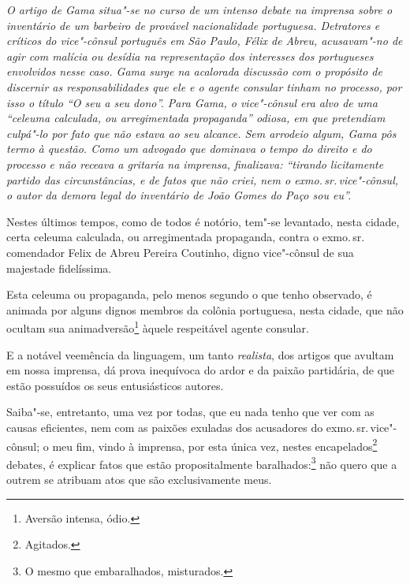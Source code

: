 
\begin{flushleft}
{\footnotesize\itshape
O artigo de Gama situa"-se no
curso de um intenso debate na imprensa sobre o inventário de um barbeiro
de provável nacionalidade portuguesa. Detratores e críticos do
vice"-cônsul português em São Paulo, Félix de Abreu, acusavam"-no de agir
com malícia ou desídia na representação dos interesses dos portugueses
envolvidos nesse caso. Gama surge na acalorada discussão com o propósito
de discernir as responsabilidades que ele e o agente consular tinham no
processo, por isso o título ``O seu a seu dono''. Para Gama, o vice"-cônsul
era alvo de uma ``celeuma calculada, ou arregimentada propaganda'' odiosa,
em que pretendiam culpá"-lo por fato que não estava ao seu alcance. Sem
arrodeio algum, Gama pôs termo à questão. Como um advogado que dominava
o tempo do direito e do processo e não receava a gritaria na imprensa,
finalizava: ``tirando licitamente partido das circunstâncias, e de
fatos que não criei, nem o exmo.\,sr.\,vice"-cônsul, o autor da demora
legal do inventário de João Gomes do Paço sou eu''. }
\end{flushleft}

\noindent{}Nestes últimos tempos, como de todos é notório, tem"-se levantado, nesta
cidade, certa celeuma calculada, ou arregimentada propaganda, contra o
exmo.\,sr.\,comendador Felix de Abreu Pereira Coutinho, digno vice"-cônsul
de sua majestade fidelíssima.

Esta celeuma ou propaganda, pelo menos segundo o que tenho observado, é
animada por alguns dignos membros da colônia portuguesa, nesta cidade,
que não ocultam sua animadversão\footnote{Aversão intensa, ódio.}
àquele respeitável agente consular.

E a notável veemência da linguagem, um tanto \emph{realista}, dos
artigos que avultam em nossa imprensa, dá prova inequívoca do ardor e da
paixão partidária, de que estão possuídos os seus entusiásticos autores.

Saiba"-se, entretanto, uma vez por todas, que eu nada tenho que ver com
as causas eficientes, nem com as paixões exuladas dos acusadores do
exmo.\,sr.\,vice"-cônsul; o meu fim, vindo à imprensa, por esta única vez,
nestes encapelados\footnote{Agitados.} debates, é explicar fatos que
estão propositalmente baralhados:\footnote{O mesmo que embaralhados,
  misturados.} não quero que a outrem se atribuam atos que são
exclusivamente meus.

